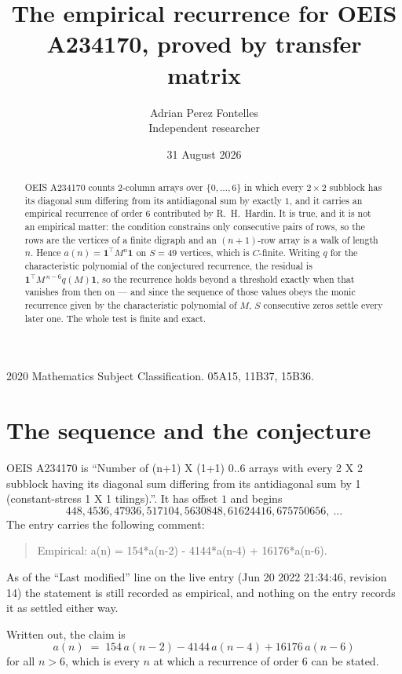 \documentclass[11pt,a4paper]{article}
\title{The empirical recurrence for OEIS A234170, proved by transfer matrix}
\author{Adrian Perez Fontelles\\ \small Independent researcher}
\date{31 August 2026}
\theoremstyle{plain}
\theoremstyle{definition}
\begin{document}
\maketitle

\begin{abstract}
OEIS A234170 counts $2$-column arrays over $\{0,\dots,6\}$ in which every
$2\times2$ subblock has its diagonal sum differing from its antidiagonal sum by
exactly $1$, and it
carries an empirical recurrence of order $6$ contributed by R.~H.~Hardin. It is true,
and it is not an empirical matter: the condition constrains only consecutive pairs of rows,
so the rows are the vertices of a finite digraph and an $(n+1)$-row array is a walk of
length $n$. Hence $a(n)=\mathbf{1}^{\!\top}M^{n}\mathbf{1}$ on $S=49$ vertices, which
is $C$-finite. Writing $q$ for the characteristic polynomial of the conjectured recurrence,
the residual is $\mathbf{1}^{\!\top}M^{\,n-6}q(M)\mathbf{1}$, so the recurrence
holds beyond a threshold exactly when that vanishes from then on --- and since the sequence
of those values obeys the monic recurrence given by the characteristic polynomial of $M$,
$S$ consecutive zeros settle every later one. The whole test is finite and exact.
\end{abstract}

\noindent\small 2020 Mathematics Subject Classification. 05A15, 11B37, 15B36.\normalsize

\section{The sequence and the conjecture}

OEIS A234170 is ``Number of (n+1) X (1+1) 0..6 arrays with every 2 X 2 subblock having its diagonal sum differing from its antidiagonal sum by 1 (constant-stress 1 X 1 tilings).''. It has offset
$1$ and begins
\[
448, 4536, 47936, 517104, 5630848, 61624416, 675750656,\ \dots
\]
The entry carries the following comment:
\begin{quote}\small
Empirical: a(n) = 154*a(n-2) - 4144*a(n-4) + 16176*a(n-6).
\end{quote}
As of the ``Last modified'' line on the live entry (Jun 20 2022 21:34:46, revision 14) the statement is
still recorded as empirical, and nothing on the entry records it as settled either way.

Written out, the claim is
\begin{equation}\label{eq:conj}
a(n)\;=\;154\,a(n-2) - 4144\,a(n-4) + 16176\,a(n-6)
\end{equation}
for all $n>6$, which is every $n$ at which a recurrence of order $6$ can be
stated.
\end{document}
